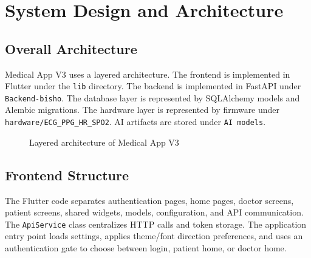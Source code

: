 \chapter{System Design and Architecture}

\section{Overall Architecture}

Medical App V3 uses a layered architecture. The frontend is implemented in Flutter under the \texttt{lib} directory. The backend is implemented in FastAPI under \texttt{Backend-bisho}. The database layer is represented by SQLAlchemy models and Alembic migrations. The hardware layer is represented by firmware under \texttt{hardware/ECG\_PPG\_HR\_SPO2}. AI artifacts are stored under \texttt{AI models}.

\begin{figure}[H]
\centering
{}
\caption{Layered architecture of Medical App V3}
\label{fig:architecture}
\end{figure}

\section{Frontend Structure}

The Flutter code separates authentication pages, home pages, doctor screens, patient screens, shared widgets, models, configuration, and API communication. The \texttt{ApiService} class centralizes HTTP calls and token storage. The application entry point loads settings, applies theme/font direction preferences, and uses an authentication gate to choose between login, patient home, or doctor home.

